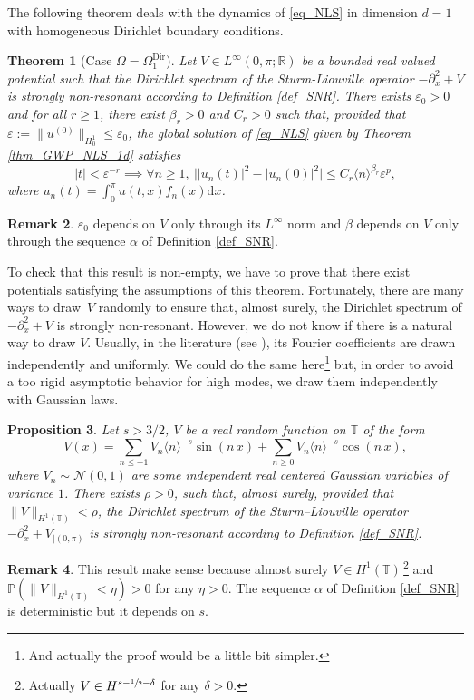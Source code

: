 \documentclass[JEP,XML,SOM,Unicode,NoEqCountersInSection,published]{cedram}
\let\epsilon\varepsilon
\newtheorem{theorem}{Theorem}[section]
\newtheorem{proposition}[theorem]{Proposition}
\theoremstyle{definition}
\newtheorem{remark}[theorem]{Remark}
\begin{document}
The following theorem deals with the dynamics of \eqref{eq_NLS} in dimension $d=1$ with homogeneous Dirichlet boundary conditions.
\begin{theorem}[Case $\Omega = \Omega^{\mathrm{Dir}}_1$]
\label{thm_Dir_1d}
Let $V \in L^\infty(0,\pi; \mathbb{R})$ be a bounded real valued potential such that the Dirichlet spectrum of the Sturm-Liouville operator $-\partial_x^2 +V$ is strongly non-resonant according to Definition \ref{def_SNR}. There exists $\epsilon_0>0$ and for all $r\geq 1$, there exist $\beta_r>0$ and $C_r>0$ such that, provided that $\varepsilon:= \| u^{(0)} \|_{H^1_0} \leq \epsilon_{0}$,
the global solution of \eqref{eq_NLS} given by Theorem \ref{thm_GWP_NLS_1d} satisfies
\[
|t|< \varepsilon^{-r} \implies \forall n\geq 1, \ \big| |u_n(t)|^2 - |u_n(0)|^2 \big| \leq C_r \langle n \rangle^{\beta_r} \varepsilon^p,
\]
where $u_n(t) = \int_0^\pi u(t,x) f_n(x) \mathrm{d}x$.
\end{theorem}
\begin{remark}
\label{rem_dep}$\epsilon_0$ depends on $V$ only through its $L^\infty$ norm and $\beta$ depends on $V$ only through the sequence $\alpha$ of Definition \ref{def_SNR}.
\end{remark}

To check that this result is non-empty, we have to prove that there exist potentials satisfying the assumptions of this theorem. Fortunately, there are many ways to draw~$V$ randomly to ensure that, almost surely, the Dirichlet spectrum of $-\partial_x^2 +V$ is strongly non-resonant. However, we do not know if there is a natural way to draw $V$. Usually, in the literature (see \eg \cite{Bou00,BG06,YZ14,KillBill,KtA}), its Fourier coefficients are drawn independently and uniformly. We could do the same here\footnote{And actually the proof would be a little bit simpler.} but, in order to avoid a too rigid asymptotic behavior for high modes, we draw them independently with Gaussian laws.

\begin{proposition}
\label{prop_proba_dir_1d}
Let $s>3/2$, $V$ be a real random function on $\mathbb{T}$ of the form
\begin{equation}
\label{eq_V_dir}
V(x) = \sum_{n\leq -1} V_n \langle n \rangle^{-s} \sin(n \, x) + \sum_{n \geq 0 } V_n \langle n \rangle^{-s} \cos(n \, x),
\end{equation}
where $V_n \sim \mathcal{N}(0,1)$ are some independent real centered Gaussian variables of variance $1$. There exists $\rho>0$, such that, almost surely, provided that $\|V\|_{H^1(\mathbb{T})}< \rho$, the Dirichlet spectrum of the Sturm--Liouville operator $-\partial_x^2 +V_{| (0,\pi)}$ is strongly non-resonant according to Definition \ref{def_SNR}.
\end{proposition}
\begin{remark} This result make sense because almost surely $V\in H^1(\mathbb{T})\,$\footnote{Actually $V\in H^{s-\sfrac12-\delta}$ for any $\delta>0$.} and $\mathbb{P}(\|V\|_{H^1(\mathbb{T})} < \eta)>0$ for any $\eta>0$. The sequence $\alpha$ of Definition \ref{def_SNR} is deterministic but it depends on $s$.
\end{remark}
\end{document}
